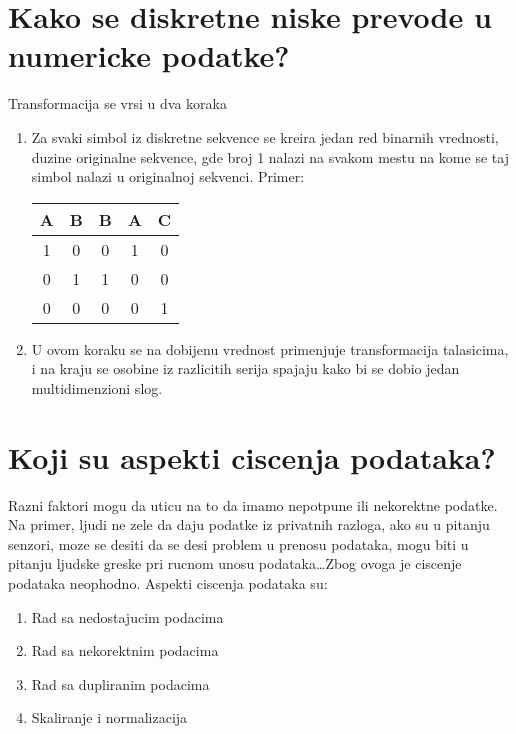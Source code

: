\documentclass[a4paper]{article}
\begin{document}
\section{Kako se diskretne niske prevode u numericke podatke?}
Transformacija se vrsi u dva koraka
\begin{enumerate}
    \item Za svaki simbol iz diskretne sekvence se kreira jedan red binarnih vrednosti, duzine
        originalne sekvence, gde broj 1 nalazi na svakom mestu na kome se taj simbol nalazi u
        originalnoj sekvenci. Primer:
        \begin{table}[H]
            \centering
            \begin{tabular}{ccccc}
                \hline
                A & B & B & A & C \\ \hline
                1 & 0 & 0 & 1 & 0 \\
                0 & 1 & 1 & 0 & 0 \\
                0 & 0 & 0 & 0 & 1 \\
            \end{tabular}
        \end{table} 
    \item U ovom koraku se na dobijenu vrednost primenjuje transformacija talasicima, i na kraju se
        osobine iz razlicitih serija spajaju kako bi se dobio jedan multidimenzioni slog.
\end{enumerate}

\section{Koji su aspekti ciscenja podataka?}
Razni faktori mogu da uticu na to da imamo nepotpune ili nekorektne podatke. Na primer, ljudi ne
zele da daju podatke iz privatnih razloga, ako su u pitanju senzori, moze se desiti da se desi
problem u prenosu podataka, mogu biti u pitanju ljudske greske pri rucnom unosu podataka\ldots Zbog
ovoga je ciscenje podataka neophodno. Aspekti ciscenja podataka su:
\begin{enumerate}
    \item Rad sa nedostajucim podacima
    \item Rad sa nekorektnim podacima
    \item Rad sa dupliranim podacima
    \item Skaliranje i normalizacija
\end{enumerate}
\end{document}
